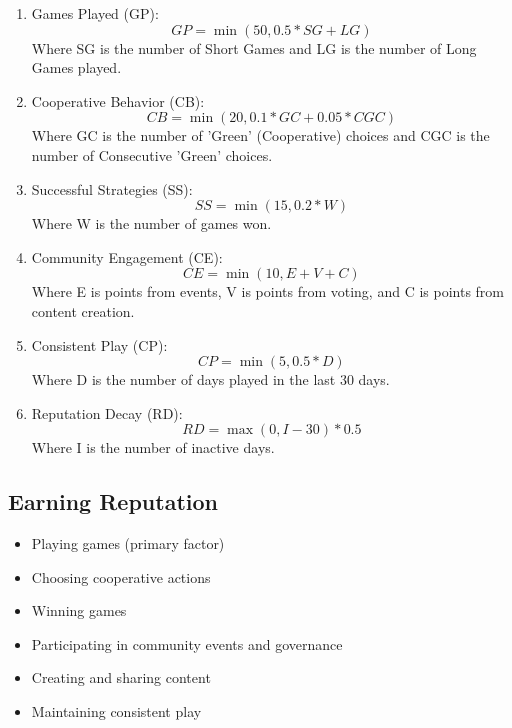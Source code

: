 \documentclass[12pt,a4paper]{article}
\begin{document}
\begin{enumerate}
  \item Games Played (GP):
  \begin{equation}
  GP = \min(50, 0.5 * SG + LG)
  \end{equation}
  Where SG is the number of Short Games and LG is the number of Long Games played.

  \item Cooperative Behavior (CB):
  \begin{equation}
  CB = \min(20, 0.1 * GC + 0.05 * CGC)
  \end{equation}
  Where GC is the number of 'Green' (Cooperative) choices and CGC is the number of Consecutive 'Green' choices.

  \item Successful Strategies (SS):
  \begin{equation}
  SS = \min(15, 0.2 * W)
  \end{equation}
  Where W is the number of games won.

  \item Community Engagement (CE):
  \begin{equation}
  CE = \min(10, E + V + C)
  \end{equation}
  Where E is points from events, V is points from voting, and C is points from content creation.

  \item Consistent Play (CP):
  \begin{equation}
  CP = \min(5, 0.5 * D)
  \end{equation}
  Where D is the number of days played in the last 30 days.

  \item Reputation Decay (RD):
  \begin{equation}
  RD = \max(0, I - 30) * 0.5
  \end{equation}
  Where I is the number of inactive days.
\end{enumerate}

\subsection{Earning Reputation}
\begin{itemize}
  \item Playing games (primary factor)
  \item Choosing cooperative actions
  \item Winning games
  \item Participating in community events and governance
  \item Creating and sharing content
  \item Maintaining consistent play
\end{itemize}
\end{document}
